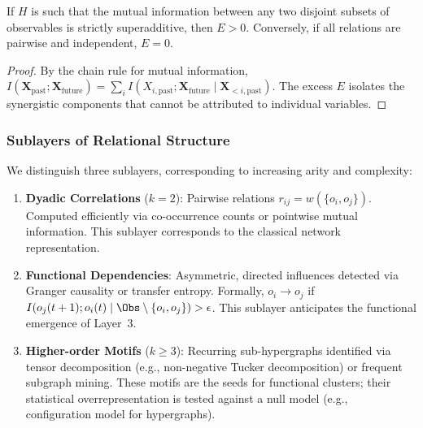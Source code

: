 \begin{proposition}
\label{prop:excess_entropy}
If $H$ is such that the mutual information between any two disjoint subsets of observables is strictly superadditive, then $E > 0$. Conversely, if all relations are pairwise and independent, $E = 0$.
\end{proposition}
\begin{proof}
By the chain rule for mutual information, $I(\mathbf{X}_{\text{past}}; \mathbf{X}_{\text{future}}) = \sum_i I(X_{i,\text{past}}; \mathbf{X}_{\text{future}} \mid \mathbf{X}_{<i,\text{past}})$. The excess $E$ isolates the synergistic components that cannot be attributed to individual variables.
\end{proof}

\subsubsection{Sublayers of Relational Structure}
We distinguish three sublayers, corresponding to increasing arity and complexity:
\begin{enumerate}
    \item \textbf{Dyadic Correlations} ($k=2$): Pairwise relations $r_{ij} = w(\{o_i, o_j\})$. Computed efficiently via co-occurrence counts or pointwise mutual information. This sublayer corresponds to the classical network representation.
    \item \textbf{Functional Dependencies}: Asymmetric, directed influences detected via Granger causality or transfer entropy. Formally, $o_i \rightarrow o_j$ if $I(o_j(t+1); o_i(t) \mid \Obs \setminus \{o_i, o_j\}) > \epsilon$. This sublayer anticipates the functional emergence of Layer~3.
    \item \textbf{Higher-order Motifs} ($k \ge 3$): Recurring sub-hypergraphs identified via tensor decomposition (e.g., non-negative Tucker decomposition) or frequent subgraph mining. These motifs are the seeds for functional clusters; their statistical overrepresentation is tested against a null model (e.g., configuration model for hypergraphs).
\end{enumerate}

